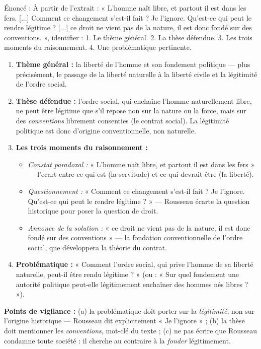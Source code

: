 \documentclass[11pt]{article}
\begin{document}
\begin{exoresolu}
Énoncé : À partir de l'extrait : « L'homme naît libre, et partout il est dans les fers. [...] Comment ce changement s'est-il fait ? Je l'ignore. Qu'est-ce qui peut le rendre légitime ? [...] ce droit ne vient pas de la nature, il est donc fondé sur des conventions. », identifier : 1. Le thème général. 2. La thèse défendue. 3. Les trois moments du raisonnement. 4. Une problématique pertinente.
\tcblower
\begin{enumerate}
\item \textbf{Thème général :} la liberté de l'homme et son fondement politique — plus précisément, le passage de la liberté naturelle à la liberté civile et la légitimité de l'ordre social.

\item \textbf{Thèse défendue :} l'ordre social, qui enchaîne l'homme naturellement libre, ne peut être légitime que s'il repose non sur la nature ou la force, mais sur des \emph{conventions} librement consenties (le contrat social). La légitimité politique est donc d'origine conventionnelle, non naturelle.

\item \textbf{Les trois moments du raisonnement :}
\begin{itemize}
\item \emph{Constat paradoxal :} « L'homme naît libre, et partout il est dans les fers » — l'écart entre ce qui est (la servitude) et ce qui devrait être (la liberté).
\item \emph{Questionnement :} « Comment ce changement s'est-il fait ? Je l'ignore. Qu'est-ce qui peut le rendre légitime ? » — Rousseau écarte la question historique pour poser la question de droit.
\item \emph{Annonce de la solution :} « ce droit ne vient pas de la nature, il est donc fondé sur des conventions » — la fondation conventionnelle de l'ordre social, que développera la théorie du contrat.
\end{itemize}

\item \textbf{Problématique :} « Comment l'ordre social, qui prive l'homme de sa liberté naturelle, peut-il être rendu légitime ? » (ou : « Sur quel fondement une autorité politique peut-elle légitimement enchaîner des hommes nés libres ? »).
\end{enumerate}

\textbf{Points de vigilance :} (a) la problématique doit porter sur la \emph{légitimité}, non sur l'origine historique — Rousseau dit explicitement « Je l'ignore » ; (b) la thèse doit mentionner les \emph{conventions}, mot-clé du texte ; (c) ne pas écrire que Rousseau condamne toute société : il cherche au contraire à la \emph{fonder} légitimement.
\end{exoresolu}
\end{document}
